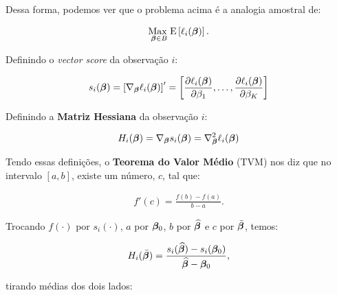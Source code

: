 \documentclass[11pt, oneside, a4paper, article]{article}
\numberwithin{equation}{section}
\begin{document}
\begin{description}
\begin{description}
Dessa forma, podemos ver que o problema acima é a analogia amostral de:

\vspace{-1 em}
\begin{align*}
\underset{\boldsymbol{\beta} \in B}{\text{Max }} 
\text{E} \left[ 
\ell_{i} ( \boldsymbol{\beta} )
\right].
\end{align*}

Definindo o \textit{vector score} da observação $i$:

\vspace{-1 em}
\begin{align*}
s_{i} (\boldsymbol{\beta}) = 
\left[ \nabla_{\boldsymbol{\beta}} \ell_{i} (\boldsymbol{\beta}) \right]'
=
\begin{bmatrix}
	\dfrac{\partial{\ell_{i} (\boldsymbol{\beta})}}{\partial{\beta_{1}}},
	\dots,
	\dfrac{\partial{\ell_{i} (\boldsymbol{\beta})}}{\partial{\beta_{K}}}
\end{bmatrix}
\end{align*}

Definindo a \textbf{Matriz Hessiana} da observação $i$:

\vspace{-1 em}
\begin{align*}
H_{i} (\boldsymbol{\beta}) = 
\nabla_{\boldsymbol{\beta}} s_{i} (\boldsymbol{\beta}) = 
\nabla_{\boldsymbol{\beta}}^2 \ell_{i} (\boldsymbol{\beta})
\end{align*}

Tendo essas definições, o \textbf{Teorema do Valor Médio} (TVM) nos diz que no intervalo $[a, b]$, existe um número, $c$, tal que:

\vspace{-1 em}
\begin{align*}
	f'(c) = \frac{f(b) - f(a)}{b - a}.
\end{align*}

\begin{center}
\end{center}

Trocando 
$f(\cdot)$ por $s_{i}(\cdot)$, 
$a$ por $\boldsymbol{\beta}_{0}$, 
$b$ por $\widehat{\boldsymbol{\beta}}$ e
$c$ por $\bar{\boldsymbol{\beta}}$,
temos:

\vspace{-1 em}
\begin{align*}
H_{i} ( \bar{\boldsymbol{\beta}} ) =
\frac{s_{i}( \widehat{\boldsymbol{\beta}} ) - s_{i}( \boldsymbol{\beta}_{0} )}{\widehat{\boldsymbol{\beta}} - \boldsymbol{\beta}_{0}},
\end{align*}

\noindent
tirando médias dos dois lados:


\end{description}
\end{description}
\end{document}
